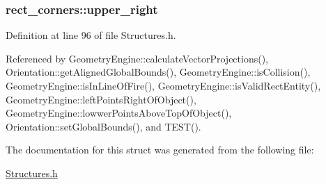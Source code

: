 \hypertarget{structrect__corners_a631310450f151fd6c92132d5d7216259}{
\subsubsection[{upper\-\_\-right}]{ rect\-\_\-corners\-::upper\-\_\-right}}\label{structrect__corners_a631310450f151fd6c92132d5d7216259}


Definition at line 96 of file Structures.\-h.



Referenced by Geometry\-Engine\-::calculate\-Vector\-Projections(), Orientation\-::get\-Aligned\-Global\-Bounds(), Geometry\-Engine\-::is\-Collision(), Geometry\-Engine\-::is\-In\-Line\-Of\-Fire(), Geometry\-Engine\-::is\-Valid\-Rect\-Entity(), Geometry\-Engine\-::left\-Points\-Right\-Of\-Object(), Geometry\-Engine\-::lowwer\-Points\-Above\-Top\-Of\-Object(), Orientation\-::set\-Global\-Bounds(), and T\-E\-S\-T().



The documentation for this struct was generated from the following file\-:\begin{DoxyCompactItemize}
\item 
\hyperlink{Structures_8h}{Structures.\-h}\end{DoxyCompactItemize}
